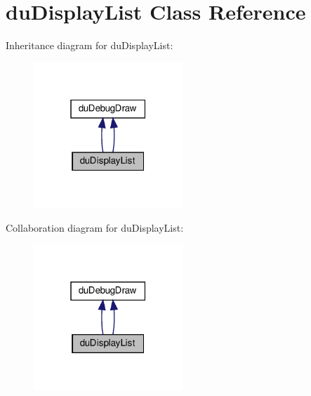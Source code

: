 \hypertarget{classduDisplayList}{}\section{du\+Display\+List Class Reference}
\label{classduDisplayList}


Inheritance diagram for du\+Display\+List\+:
\nopagebreak
\begin{figure}[H]
\begin{center}
\leavevmode
\includegraphics[width=159pt]{classduDisplayList__inherit__graph}
\end{center}
\end{figure}


Collaboration diagram for du\+Display\+List\+:
\nopagebreak
\begin{figure}[H]
\begin{center}
\leavevmode
\includegraphics[width=159pt]{classduDisplayList__coll__graph}
\end{center}
\end{figure}
